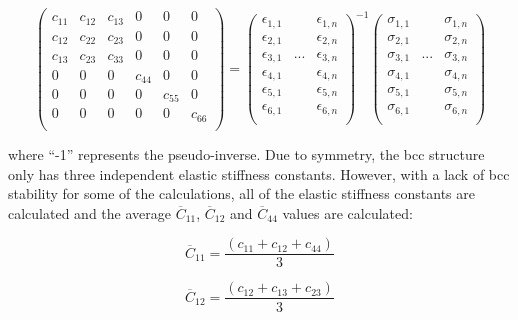 \begin{equation}
\label{eq: hookes}
\begin{pmatrix}
	c_{11} & c_{12} & c_{13} & 0 & 0 & 0\\
	c_{12} & c_{22} & c_{23} & 0 & 0 & 0\\
	c_{13} & c_{23} & c_{33} & 0 & 0 & 0\\
	0 & 0 & 0 & c_{44} & 0 & 0\\
	0 & 0 & 0 & 0 &  c_{55} & 0\\
	0 & 0 & 0 & 0 & 0 & c_{66} \\    		
\end{pmatrix} =
\begin{pmatrix}
	\epsilon_{1,1} & & \epsilon_{1,n}\\
	\epsilon_{2,1} & & \epsilon_{2,n}\\
	\epsilon_{3,1} & ... & \epsilon_{3,n}\\
	\epsilon_{4,1} & & \epsilon_{4,n}\\
	\epsilon_{5,1} & & \epsilon_{5,n}\\
	\epsilon_{6,1} & & \epsilon_{6,n}\\					
\end{pmatrix}^{-1}
\begin{pmatrix}
	\sigma_{1,1} & & \sigma_{1,n}\\
	\sigma_{2,1} & & \sigma_{2,n}\\
	\sigma_{3,1} & ... & \sigma_{3,n}\\
	\sigma_{4,1} & & \sigma_{4,n}\\
	\sigma_{5,1} & & \sigma_{5,n}\\
	\sigma_{6,1} & & \sigma_{6,n}\\					
\end{pmatrix}
\end{equation}

where “-1” represents the pseudo-inverse. Due to symmetry, the bcc structure only has three independent elastic stiffness constants. However, with a lack of bcc stability for some of the calculations, all of the elastic stiffness constants are calculated and the average $\overline{C}_{11}$, $\overline{C}_{12}$ and $\overline{C}_{44}$ values are calculated:

\begin{equation}
\label{eq: averagec11}
\overline{C}_{11} = \frac{(c_{11} + c_{12} + c_{44})}{3}
\end{equation}

\begin{equation}
\label{eq: averagec12}
\overline{C}_{12} = \frac{(c_{12} + c_{13} + c_{23})}{3}
\end{equation}

